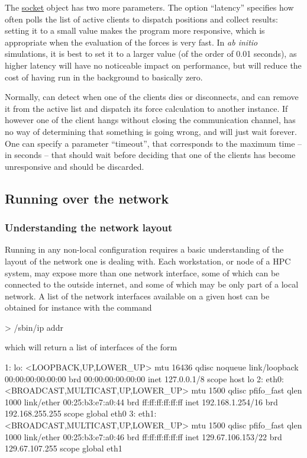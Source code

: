 \documentclass[11pt,english,fleqn]{report}
\newenvironment{code}{%
\footnotesize 
\verbatim
}{
\endverbatim
\normalsize
}
\begin{document}
The \hyperref[FFSOCKET]{socket} object has two more parameters.
The option ``latency'' specifies how often \ipi{} polls the list of 
active clients to dispatch positions and collect results:
setting it to a small value makes the program more responsive, 
which is appropriate when the evaluation of the forces is very
fast. In \emph{ab initio} simulations, it is best to set it to 
a larger value (of the order of 0.01 seconds), as higher latency 
will have no noticeable impact on performance, but will reduce 
the cost of having \ipi run in the background to basically zero. 

Normally, \ipi can detect when one of the clients dies or disconnects,
and can remove it from the active list and dispatch its force calculation
to another instance. If however one of the client hangs without 
closing the communication channel, \ipi has no way of determining that
something is going wrong, and will just wait forever. One can 
specify a parameter ``timeout'', that corresponds to the maximum time -- in 
seconds -- that \ipi should wait before deciding that one of the clients
has become unresponsive and should be discarded.

\subsection{Running \ipi over the network}

\subsubsection{Understanding the network layout}

Running \ipi in any non-local configuration requires a basic understanding
of the layout of the network one is dealing with. Each workstation, or node
of a HPC system, may expose more than one network interface, some of which
can be connected to the outside internet, and some of which may be only part
of a local network. A list of the network interfaces available on a given host
can be obtained for instance with the command

\begin{code}
> /sbin/ip addr
\end{code}

\noindent which will return a list of interfaces of the form

\begin{code}
1: lo: <LOOPBACK,UP,LOWER_UP> mtu 16436 qdisc noqueue 
    link/loopback 00:00:00:00:00:00 brd 00:00:00:00:00:00
    inet 127.0.0.1/8 scope host lo
2: eth0: <BROADCAST,MULTICAST,UP,LOWER_UP> mtu 1500 qdisc pfifo_fast qlen 1000
    link/ether 00:25:b3:e7:a0:44 brd ff:ff:ff:ff:ff:ff
    inet 192.168.1.254/16 brd 192.168.255.255 scope global eth0
3: eth1: <BROADCAST,MULTICAST,UP,LOWER_UP> mtu 1500 qdisc pfifo_fast qlen 1000
    link/ether 00:25:b3:e7:a0:46 brd ff:ff:ff:ff:ff:ff
    inet 129.67.106.153/22 brd 129.67.107.255 scope global eth1
\end{code}
\end{document}
